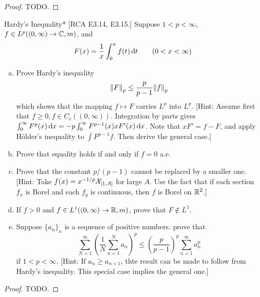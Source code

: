 \begin{proof}
    TODO. 
\end{proof}


\begin{problem}{Hardy's Inequality}*
    [RCA E3.14, E3.15.] Suppose \(1 < p < \infty\), \(f \in L^p((0, \infty) \to \mathbb{C}, m)\), and 
    \[
        F(x) = \frac{1}{x} \int_0^x f(t) \, \mathrm{d}t
        \qquad
        (0 < x < \infty)
    \]
    \begin{enumerate}[(a)]
        \itemsep0em
        \item Prove Hardy's inequality 
        \[
            \norm{F}_p \leq \frac{p}{p-1} \norm{f}_p
        \]
        which shows that the mapping \(f \mapsto F\) carries \(L^p\) into \(L^p\). [Hint: Assume first that \(f \geq 0, f \in C_c((0,\infty))\). Integration by parts gives \(\int_0^\infty F^p(x) \, \mathrm{d}x = -p \int_0^\infty F^{p-1}(x) x F'(x) \, \mathrm{d}x\). Note that \(xF' = f - F\), and apply H\"older's inequality to \(\int F^{p-1} f\). Then derive the general case.]
        \item Prove that equality holds if and only if \(f = 0\) a.e. 
        \item Prove that the constant \(p/(p-1)\) cannot be replaced by a smaller one. [Hint: Take \(f(x) = x^{-1/p} \mathcal{X}_{[1, A]}\) for large \(A\). Use the fact that if each section \(f_x\) is Borel and each \(f_y\) is continuous, then \(f\) is Borel on \(\mathbb{R}^2\).]
        \item If \(f > 0\) and \(f \in L^1((0, \infty) \to \mathbb{R}, m)\), prove that \(F \not\in L^1\). 
        \item Suppose \(\{a_n\}_n\) is a sequence of positive numbers. prove that 
        \[
            \sum_{N=1}^\infty \left( \frac{1}{N} \sum_{n=1}^N a_n \right)^p
            \leq \left( \frac{p}{p-1} \right)^p \sum_{n=1}^\infty a_n^p
        \]
        if \(1 < p < \infty\). [Hint: If \(a_n \geq a_{n+1}\), thte result can be made to follow from Hardy's inequality. This special case implies the general one.]
    \end{enumerate}
\end{problem}


\begin{proof}
    TODO. 
\end{proof}


